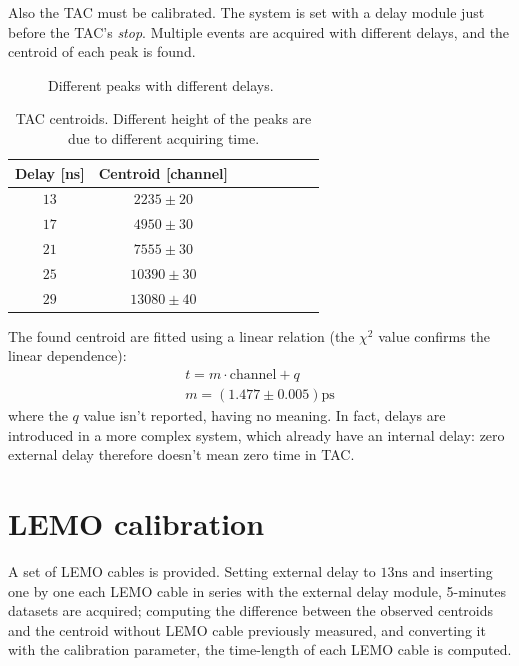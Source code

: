 \documentclass[11pt,a4 paper]{article}
\begin{document}
%
Also the TAC must be calibrated. The system is set with a delay module just before the TAC's \emph{stop}. Multiple events are acquired with different delays, and the centroid of each peak is found.

\begin{figure}[H]
    \centering
    \caption{Different peaks with different delays.}
    \label{fig:tac:calibr}
\end{figure}

\begin{table}[H]
    \centering
    \begin{tabular}{cccccccc}
        \toprule
        Delay [ns] & Centroid [channel] \\
        \midrule
        $13$ & $2235\pm 20$ \\
        $17$ & $4950\pm 30$ \\
        $21$ & $7555\pm 30$ \\
        $25$ & $10390\pm 30$ \\
        $29$ & $13080\pm 40$ \\
        \bottomrule
    \end{tabular}
    \caption{TAC centroids. Different height of the peaks are due to different acquiring time.}
    \label{tab:tac:calibr}
\end{table}

The found centroid are fitted using a linear relation (the $\chi^2$ value confirms the linear dependence):
\begin{gather*}
    t = m\cdot \text{channel} + q \\
    m = ( 1.477 \pm 0.005) \si{\pico\second}
\end{gather*}
where the $q$ value isn't reported, having no meaning. In fact, delays are introduced in a more complex system, which already have an internal delay: zero external delay therefore doesn't mean zero time in TAC.

\section{LEMO calibration}
A set of LEMO cables is provided. Setting external delay to $13\si{\nano\second}$ and inserting one by one each LEMO cable in series with the external delay module, 5-minutes datasets are acquired; computing the difference between the observed centroids and the centroid without LEMO cable previously measured, and converting it with the calibration parameter, the time-length of each LEMO cable is computed.
\end{document}
